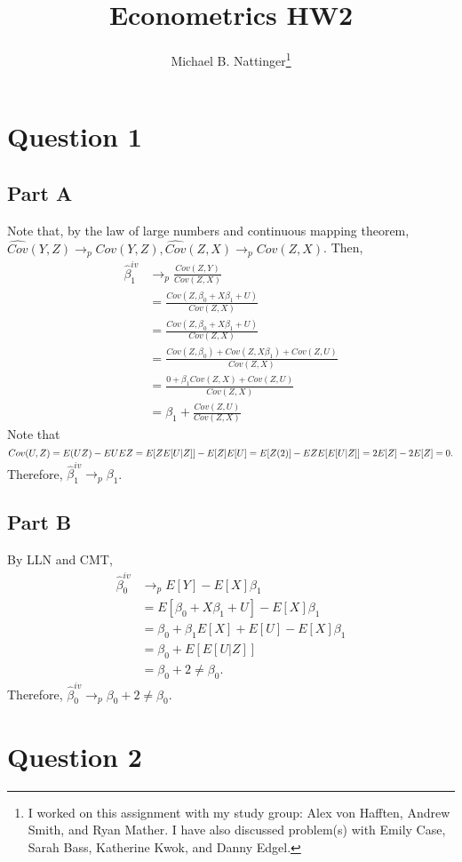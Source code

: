 \documentclass[11pt]{article} %
\title{Econometrics HW2}
\author{Michael B. Nattinger\footnote{I worked on this assignment with my study group: Alex von Hafften, Andrew Smith, and Ryan Mather. I have also discussed problem(s) with Emily Case, Sarah Bass, Katherine Kwok, and Danny Edgel.}}
\begin{document}
\maketitle

\section{Question 1}
\subsection{Part A}
Note that, by the law of large numbers and continuous mapping theorem, $\hat{Cov}(Y,Z) \rightarrow_p Cov(Y,Z), \hat{Cov}(Z,X) \rightarrow_p Cov(Z,X)$. 
Then,
\begin{align*}
\hat{\beta}^{iv}_1 &\rightarrow_p \frac{Cov(Z,Y)}{Cov(Z,X)}\\
&=\frac{Cov(Z,\beta_0 + X\beta_1 + U)}{Cov(Z,X)}\\
&=\frac{Cov(Z,\beta_0 + X\beta_1 + U)}{Cov(Z,X)}\\
&= \frac{Cov(Z,\beta_0) + Cov(Z,X\beta_1) + Cov(Z,U)}{Cov(Z,X)}\\
&= \frac{0 + \beta_1Cov(Z,X) + Cov(Z,U)}{Cov(Z,X)}\\
&= \beta_1 +  \frac{ Cov(Z,U)}{Cov(Z,X)}
\end{align*}
Note that $Cov(U,Z) = E(UZ) - EUEZ =\\ E[ZE[U|Z]] - E[Z]E[U] = E[Z(2)] - EZE[E[U|Z]] = 2E[Z] - 2E[Z] = 0.$ Therefore, $\hat{\beta}^{iv}_1 \rightarrow_p \beta_1$.
\subsection{Part B}
By LLN and CMT,
\begin{align*}
\hat{\beta}^{iv}_0 &\rightarrow_p E[Y] - E[X]\beta_1\\
&=  E[\beta_0 + X\beta_1 + U] - E[X]\beta_1\\
&= \beta_0 + \beta_1 E[X] + E[U] - E[X]\beta_1\\
&= \beta_0 + E[E[U|Z]]\\
& = \beta_0 + 2 \neq \beta_0.
\end{align*}
Therefore, $\hat{\beta}^{iv}_0 \rightarrow_p \beta_0 + 2 \neq \beta_0.$
\section{Question 2}
\end{document}
